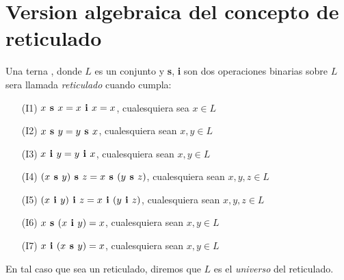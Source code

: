 
\section{Version algebraica del concepto de reticulado}
\begin{definition}
  Una terna \reticulAlg, donde $L$ es un conjunto y \textbf{s}, \textbf{i} son dos operaciones
  binarias sobre $L$ sera llamada \emph{reticulado} cuando cumpla:
  \begin{enumerate}
    \item[(I1)] $x\textbf{ s }x = x\textbf{ i }x = x$, cualesquiera sea $x \in L$
    \item[(I2)] $x\textbf{ s }y = y\textbf{ s }x$, cualesquiera sean $x,y \in L$
    \item[(I3)] $x\textbf{ i }y = y\textbf{ i }x$, cualesquiera sean $x,y \in L$
    \item[(I4)] $(x\textbf{ s }y)\textbf{ s }z = x\textbf{ s }(y\textbf{ s }z)$, cualesquiera sean $x,y,z \in L$
    \item[(I5)] $(x\textbf{ i }y)\textbf{ i }z = x\textbf{ i }(y\textbf{ i }z)$, cualesquiera sean $x,y,z \in L$
    \item[(I6)] $x\textbf{ s }(x\textbf{ i }y) = x$, cualesquiera sean $x,y \in L$
    \item[(I7)] $x\textbf{ i }(x\textbf{ s }y) = x$, cualesquiera sean $x,y \in L$
  \end{enumerate}

  En tal caso que \reticulAlg sea un reticulado, diremos que $L$ es el \emph{universo} del reticulado.
\end{definition}

